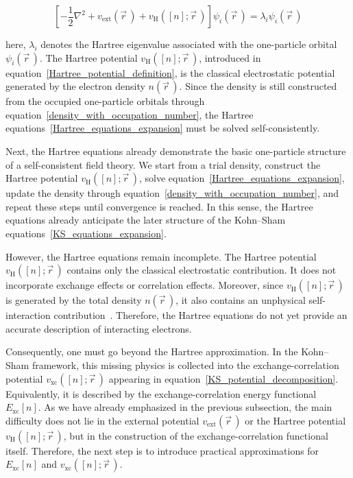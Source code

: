 \begin{equation}
    \left[-\frac{1}{2}\nabla^2
        + v_\mathrm{ext}(\vec{r}\,)
        + v_\mathrm{H}([n];\vec{r}\,)\right]
    \psi_i(\vec{r}\,)
    = \lambda_i \psi_i(\vec{r}\,)
\label{Hartree_equations_expansion}
\end{equation}

here, $\lambda_i$ denotes the Hartree eigenvalue associated with the one-particle orbital $\psi_i(\vec{r}\,)$.
The Hartree potential $v_\mathrm{H}([n];\vec{r}\,)$, introduced in equation~\eqref{Hartree_potential_definition}, is the classical electrostatic potential generated by the electron density $n(\vec{r}\,)$.
Since the density is still constructed from the occupied one-particle orbitals through equation~\eqref{density_with_occupation_number},
the Hartree equations~\eqref{Hartree_equations_expansion} must be solved self-consistently.

Next, the Hartree equations already demonstrate the basic one-particle structure of a self-consistent field theory.
We start from a trial density,
construct the Hartree potential $v_\mathrm{H}([n];\vec{r}\,)$,
solve equation~\eqref{Hartree_equations_expansion},
update the density through equation~\eqref{density_with_occupation_number},
and repeat these steps until convergence is reached.
In this sense, the Hartree equations already anticipate the later structure of the Kohn--Sham equations~\eqref{KS_equations_expansion}.

However, the Hartree equations remain incomplete.
The Hartree potential $v_\mathrm{H}([n];\vec{r}\,)$ contains only the classical electrostatic contribution.
It does not incorporate exchange effects or correlation effects.
Moreover, since $v_\mathrm{H}([n];\vec{r}\,)$ is generated by the total density $n(\vec{r}\,)$,
it also contains an unphysical self-interaction contribution~\cite{perdew1981self}.
Therefore, the Hartree equations do not yet provide an accurate description of interacting electrons.

Consequently, one must go beyond the Hartree approximation.
In the Kohn--Sham framework, this missing physics is collected into the exchange-correlation potential $v_\mathrm{xc}([n];\vec{r}\,)$ appearing in equation~\eqref{KS_potential_decomposition}.
Equivalently, it is described by the exchange-correlation energy functional $E_\mathrm{xc}[n]$.
As we have already emphasized in the previous subsection,
the main difficulty does not lie in the external potential $v_\mathrm{ext}(\vec{r}\,)$ or the Hartree potential $v_\mathrm{H}([n];\vec{r}\,)$,
but in the construction of the exchange-correlation functional itself.
Therefore, the next step is to introduce practical approximations for $E_\mathrm{xc}[n]$ and $v_\mathrm{xc}([n];\vec{r}\,)$.

